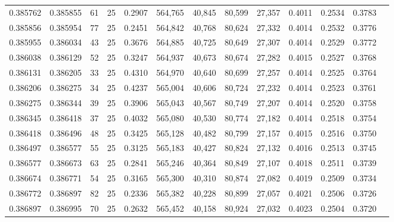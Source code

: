 \begin{tabular}{rrrrrrrrrrrrr}
0.385762 & 0.385855 &    61 &  25 &                                     0.2907 & 564,765 &  40,845 &  80,599 &  27,357 & 0.4011 & 0.2534 & 0.3783 \\
0.385856 & 0.385954 &    77 &  25 &                                     0.2451 & 564,842 &  40,768 &  80,624 &  27,332 & 0.4014 & 0.2532 & 0.3776 \\
0.385955 & 0.386034 &    43 &  25 &                                     0.3676 & 564,885 &  40,725 &  80,649 &  27,307 & 0.4014 & 0.2529 & 0.3772 \\
0.386038 & 0.386129 &    52 &  25 &                                     0.3247 & 564,937 &  40,673 &  80,674 &  27,282 & 0.4015 & 0.2527 & 0.3768 \\
0.386131 & 0.386205 &    33 &  25 &                                     0.4310 & 564,970 &  40,640 &  80,699 &  27,257 & 0.4014 & 0.2525 & 0.3764 \\
0.386206 & 0.386275 &    34 &  25 &                                     0.4237 & 565,004 &  40,606 &  80,724 &  27,232 & 0.4014 & 0.2523 & 0.3761 \\
0.386275 & 0.386344 &    39 &  25 &                                     0.3906 & 565,043 &  40,567 &  80,749 &  27,207 & 0.4014 & 0.2520 & 0.3758 \\
0.386345 & 0.386418 &    37 &  25 &                                     0.4032 & 565,080 &  40,530 &  80,774 &  27,182 & 0.4014 & 0.2518 & 0.3754 \\
0.386418 & 0.386496 &    48 &  25 &                                     0.3425 & 565,128 &  40,482 &  80,799 &  27,157 & 0.4015 & 0.2516 & 0.3750 \\
0.386497 & 0.386577 &    55 &  25 &                                     0.3125 & 565,183 &  40,427 &  80,824 &  27,132 & 0.4016 & 0.2513 & 0.3745 \\
0.386577 & 0.386673 &    63 &  25 &                                     0.2841 & 565,246 &  40,364 &  80,849 &  27,107 & 0.4018 & 0.2511 & 0.3739 \\
0.386674 & 0.386771 &    54 &  25 &                                     0.3165 & 565,300 &  40,310 &  80,874 &  27,082 & 0.4019 & 0.2509 & 0.3734 \\
0.386772 & 0.386897 &    82 &  25 &                                     0.2336 & 565,382 &  40,228 &  80,899 &  27,057 & 0.4021 & 0.2506 & 0.3726 \\
0.386897 & 0.386995 &    70 &  25 &                                     0.2632 & 565,452 &  40,158 &  80,924 &  27,032 & 0.4023 & 0.2504 & 0.3720 \\

\end{tabular}
